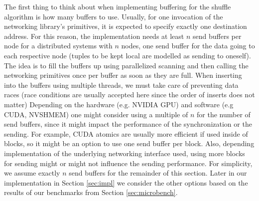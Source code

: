 The first thing to think about when implementing buffering for the shuffle algorithm is how many buffers to use.
Usually, for one invocation of the networking library's primitives, it is expected to specify exactly one destination address.
For this reason, the implementation needs at least $n$ send buffers per node for a distributed systems with $n$ nodes, one send buffer for the data going to each respective node (tuples to be kept local are modelled as sending to oneself).
The idea is to fill the buffers up using parallelized scanning and then calling the networking primitives once per buffer as soon as they are full.
When inserting into the buffers using multiple threads, we must take care of preventing data races (race conditions are usually accepted here since the order of inserts does not matter)
Depending on the hardware (e.g. NVIDIA GPU) and software (e.g CUDA, NVSHMEM) one might consider using a multiple of $n$ for the number of send buffers, since it might impact the performance of the synchronization or the sending.
For example, CUDA atomics are usually more efficient if used inside of blocks, so it might be an option to use one send buffer per block.
Also, depending implementation of the underlying networking interface used, using more blocks for sending might or might not influence the sending performance.
For simplicity, we assume exactly $n$ send buffers for the remainder of this section.
Later in our implementation in Section \ref{sec:impl} we consider the other options based on the results of our benchmarks from Section \ref{sec:microbench}.

